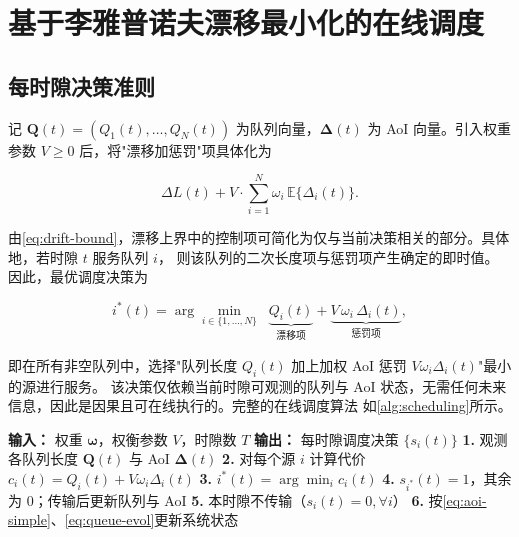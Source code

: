 \section{基于李雅普诺夫漂移最小化的在线调度}

\subsection{每时隙决策准则}

记 $\boldsymbol{Q}(t)=(Q_1(t),\ldots,Q_N(t))$ 为队列向量，$\boldsymbol{\Delta}(t)$ 为 AoI 向量。引入权重
参数 $V\ge 0$ 后，将"漂移加惩罚"项具体化为

\begin{equation}\label{eq:drift-plus}
  \Delta L(t) + V\cdot \sum_{i=1}^{N}\omega_i\,\mathbb{E}\{\Delta_i(t)\}.
\end{equation}

由\cref{eq:drift-bound}，漂移上界中的控制项可简化为仅与当前决策相关的部分。具体地，若时隙 $t$ 服务队列 $i$，
则该队列的二次长度项与惩罚项产生确定的即时值。因此，最优调度决策为

\begin{equation}\label{eq:decision}
  i^{*}(t) = \arg\min_{i\in\{1,\ldots,N\}}\;\;
  \underbrace{Q_i(t)}_{漂移项} + \underbrace{V\,\omega_i\,\Delta_i(t)}_{惩罚项},
\end{equation}

即在所有非空队列中，选择"队列长度 $Q_i(t)$ 加上加权 AoI 惩罚 $V\omega_i\Delta_i(t)$"最小的源进行服务。
该决策仅依赖当前时隙可观测的队列与 AoI 状态，无需任何未来信息，因此是因果且可在线执行的。完整的在线调度算法
如\cref{alg:scheduling}所示。

\begin{algorithm}[htb]
  \caption{基于李雅普诺夫漂移最小化的在线调度}\label{alg:scheduling}
  \begin{algorithmic}
    \STATE \textbf{输入：} 权重 $\boldsymbol{\omega}$，权衡参数 $V$，时隙数 $T$
    \STATE \textbf{输出：} 每时隙调度决策 $\{s_i(t)\}$
    \alginputrule
      \STATE \textbf{1.} 观测各队列长度 $\boldsymbol{Q}(t)$ 与 AoI $\boldsymbol{\Delta}(t)$
      \STATE \textbf{2.} 对每个源 $i$ 计算代价 $c_i(t)=Q_i(t)+V\omega_i\Delta_i(t)$
      \STATE \textbf{3.} $i^{*}(t)=\arg\min_{i}c_i(t)$
        \STATE \textbf{4.} $s_{i^{*}}(t)=1$，其余为 $0$；传输后更新队列与 AoI
      \ELSE
        \STATE \textbf{5.} 本时隙不传输（$s_i(t)=0,\forall i$）
      \ENDIF
      \STATE \textbf{6.} 按\cref{eq:aoi-simple}、\cref{eq:queue-evol}更新系统状态
    \ENDFOR
  \end{algorithmic}
\end{algorithm}

